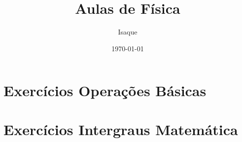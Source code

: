 \documentclass[12pt,a4paper]{book}
\begin{document}
	
	\title{Aulas de Física}
	\author{Isaque}
	\date{\today}
	\maketitle
	
	\tableofcontents
	
	\chapter{Exercícios Operações Básicas}
	
	
	
		
	\chapter{Exercícios Intergraus Matemática }
	
	
	
	
\end{document}
